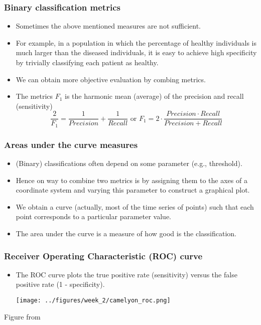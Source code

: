 \documentclass[notes]{beamer}          %
\begin{document}
\begin{frame}
\frametitle{Binary classification metrics}
    \begin{itemize}
        \item Sometimes the above mentioned measures are not sufficient.
        \item For example, in a population in which the percentage of healthy individuals is much larger than the diseased individuals, it is easy to achieve high specificity by trivially classifying each patient as healthy.
        \item We can obtain more objective evaluation by combing metrics.
        \item The metrics $F_1$ is the harmonic mean (average) of the precision and recall (sensitivity)
        $$
        \frac{2}{F_1} = \frac{1}{Precision}+\frac{1}{Recall} \text{  or  } F_1 = 2 \cdot \frac{Precision \cdot Recall}{Precision+Recall}
        $$
    \end{itemize}
\end{frame}

\begin{frame}
\frametitle{Areas under the curve measures}
    \begin{itemize}
        \item (Binary) classifications often depend on some parameter (e.g., threshold).
        \item Hence on way to combine two metrics is by assigning them to the axes of a coordinate system and varying this parameter to construct a graphical plot.
        \item We obtain a curve (actually, most of the time series of points) such that each point corresponds to a particular parameter value.
        \item The area under the curve is a measure of how good is the classification.
    \end{itemize}
\end{frame}


\begin{frame}
\frametitle{Receiver Operating Characteristic (ROC) curve}
    \begin{itemize}
        \item The ROC curve plots the true positive rate (sensitivity) versus the false positive rate (1 - specificity).
        \begin{center}
        \texttt{[image: ../figures/week\_2/camelyon\_roc.png]}
        \end{center}
    \end{itemize}
    {\tiny Figure from \cite{camelyon}}
\end{frame}
\end{document}

